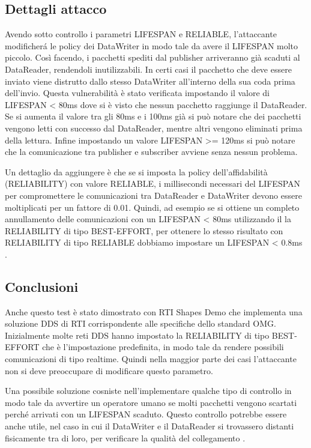 

\subsection{Dettagli attacco}
Avendo sotto controllo i parametri LIFESPAN e RELIABLE, l'attaccante modificherá le
policy dei DataWriter in modo tale da avere il LIFESPAN molto piccolo. Così
facendo, i pacchetti spediti dal publisher arriveranno già scaduti al DataReader,
rendendoli inutilizzabili. In certi casi il pacchetto che deve essere inviato
viene distrutto dallo stesso DataWriter all'interno della sua coda prima dell'invio. 
Questa vulnerabilità è stato verificata impostando il valore di
LIFESPAN < 80ms dove si è visto che nessun pacchetto raggiunge il DataReader.
Se si aumenta il valore tra gli 80ms e i 100ms già si può notare che dei pacchetti
vengono letti con successo dal DataReader, mentre altri vengono eliminati prima
della lettura. Infine impostando un valore LIFESPAN >= 120ms si può notare che
la comunicazione tra publisher e subscriber avviene senza nessun problema.

Un dettaglio da aggiungere è che se si imposta la policy
dell'affidabilità (RELIABILITY) con valore RELIABLE, i millisecondi necessari
del LIFESPAN per compromettere le comunicazioni tra DataReader e DataWriter
devono essere moltiplicati per un fattore di 0.01. Quindi, ad esempio se si
ottiene un completo annullamento delle comunicazioni con un LIFESPAN < 80ms
utilizzando il la RELIABILITY di tipo BEST-EFFORT, per ottenere lo stesso
risultato con RELIABILITY di tipo RELIABLE dobbiamo impostare un
LIFESPAN < 0.8ms
\cite{DBLP:conf/malware/MichaudDL18}.

\subsection{Conclusioni}
Anche questo test è stato dimostrato con RTI Shapes Demo che 
implementa una
soluzione DDS di RTI corrispondente alle specifiche dello standard OMG.
Inizialmente molte reti DDS hanno impostato la RELIABILITY
di tipo BEST-EFFORT che è l'impostazione predefinita,
in modo tale da rendere possibili comunicazioni di tipo realtime.
Quindi nella maggior parte
dei casi l'attaccante non si deve preoccupare di modificare questo parametro.

Una possibile soluzione cosniste nell'implementare qualche tipo di controllo
in modo tale da avvertire un operatore umano se molti pacchetti vengono
scartati perché arrivati con un LIFESPAN scaduto. Questo controllo potrebbe
essere anche utile, nel caso in cui il DataWriter e il DataReader si trovassero
distanti fisicamente tra di loro, per verificare la qualità del collegamento
\cite{DBLP:conf/malware/MichaudDL18}.



